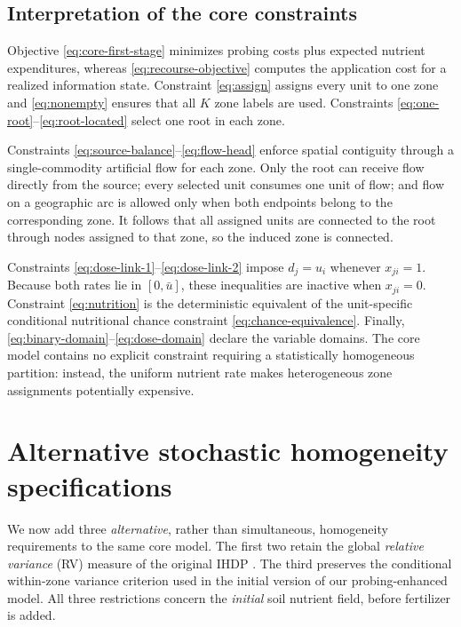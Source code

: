 \subsection{Interpretation of the core constraints}
\label{subsec:core-interpretation}

Objective \eqref{eq:core-first-stage} minimizes probing costs plus
expected nutrient expenditures, whereas
\eqref{eq:recourse-objective} computes the application cost for a
realized information state. Constraint \eqref{eq:assign} assigns every
unit to one zone and \eqref{eq:nonempty} ensures that all $K$ zone
labels are used. Constraints \eqref{eq:one-root}--\eqref{eq:root-located}
select one root in each zone.

Constraints \eqref{eq:source-balance}--\eqref{eq:flow-head} enforce
spatial contiguity through a single-commodity artificial flow for each
zone. Only the root can receive flow directly from the source; every
selected unit consumes one unit of flow; and flow on a geographic arc
is allowed only when both endpoints belong to the corresponding zone.
It follows that all assigned units are connected to the root through
nodes assigned to that zone, so the induced zone is connected.

Constraints \eqref{eq:dose-link-1}--\eqref{eq:dose-link-2} impose
$d_j=u_i$ whenever $x_{ji}=1$. Because both rates lie in
$[0,\bar u]$, these inequalities are inactive when $x_{ji}=0$.
Constraint \eqref{eq:nutrition} is the deterministic equivalent of
the unit-specific conditional nutritional chance constraint
\eqref{eq:chance-equivalence}. Finally,
\eqref{eq:binary-domain}--\eqref{eq:dose-domain} declare the variable
domains. The core model contains no explicit constraint requiring a
statistically homogeneous partition: instead, the uniform nutrient
rate makes heterogeneous zone assignments potentially expensive.

\section{Alternative stochastic homogeneity specifications}
\label{sec:homogeneity-alternatives}

We now add three \emph{alternative}, rather than simultaneous,
homogeneity requirements to the same core model. The first two retain
the global \emph{relative variance} (RV) measure of the original IHDP
\citep{VicencioMedinaIHDP}. The third preserves the conditional
within-zone variance criterion used in the initial version of our
probing-enhanced model. All three restrictions concern the \emph{initial}
soil nutrient field, before fertilizer is added.

